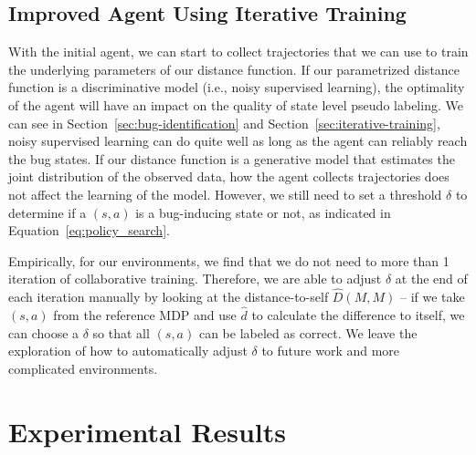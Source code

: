 \documentclass{article}
\newcommand{\EDIT}[1]{#1}%
\begin{document}
\subsection{Improved Agent Using Iterative Training}
\label{sec:ct-alg}
\vspace{-2mm} 
\EDIT{With} the initial agent, we can start to collect trajectories that we can use to train the underlying parameters of our distance function. 
\EDIT{If our parametrized distance function is a discriminative model (i.e., noisy supervised learning), the optimality of the agent will have an impact on the quality of state level pseudo labeling. We can see in Section~\ref{sec:bug-identification} and Section~\ref{sec:iterative-training}, noisy supervised learning can do quite well as long as the agent can reliably reach the bug states. If our distance function is a generative model that estimates the joint distribution of the observed data, how the agent collects trajectories does not affect the learning of the model. However, we still need to set a threshold $\delta$ to determine}
if a $(s, a)$ is a bug-inducing state or not, \EDIT{as indicated in Equation~\ref{eq:policy_search}.}

Empirically, for our environments, \EDIT{we find that} we do not need to more than 1 iteration of collaborative training. Therefore, we are able to adjust $\delta$ at the end of each iteration manually by looking at the distance-to-self $\hat D(M, M)$ -- if we take $(s, a)$ from the reference MDP and use $\hat d$ to calculate the difference to itself, we can choose a $\delta$ so that all $(s, a)$ can be labeled as correct. We leave the exploration of how to automatically adjust $\delta$ to future work and more complicated environments.





\section{\EDIT{Experimental Results}}
\vspace{-2mm} 
\end{document}
